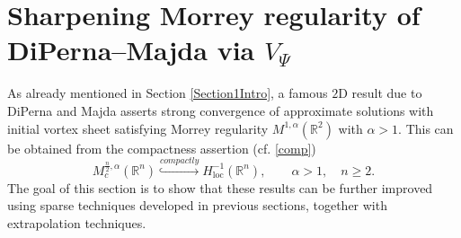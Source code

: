 \documentclass[11pt, a4paper,leqno]{amsart}
\newtheorem{theorem}{Theorem}
\theoremstyle{plain}
\newtheorem{corollary}{Corollary}
\newtheorem{problem}{Problem}
\numberwithin{equation}{section}
\theoremstyle{definition}
\theoremstyle{remark}
\def\R{\mathbb{R}}
\begin{document}
%
%


%
%
%
%
%
%
%

\section{Sharpening Morrey regularity of DiPerna--Majda via $V_\Psi$}\label{SectionDMaj}


As already mentioned in Section \ref{Section1Intro}, a famous $2$D result  due to DiPerna and Majda \cite{DiPernaMajda} asserts strong convergence of approximate solutions with initial vortex sheet satisfying Morrey regularity $M^{1, \alpha}(\R^2)$ with $\alpha > 1$. This can be obtained from the compactness assertion  (cf. \eqref{comp})
\begin{equation}\label{71}
M^{\frac{n}{2},\alpha}_c(\R^n)\overset{compactly}{\hookrightarrow}H^{-1}_{\text{loc}}(\R^n
), \qquad \alpha > 1, \quad n \geq 2.
\end{equation}
The goal of this section is to show that these results can be further improved using sparse techniques developed in previous sections,  together with extrapolation techniques. 
\end{document}
